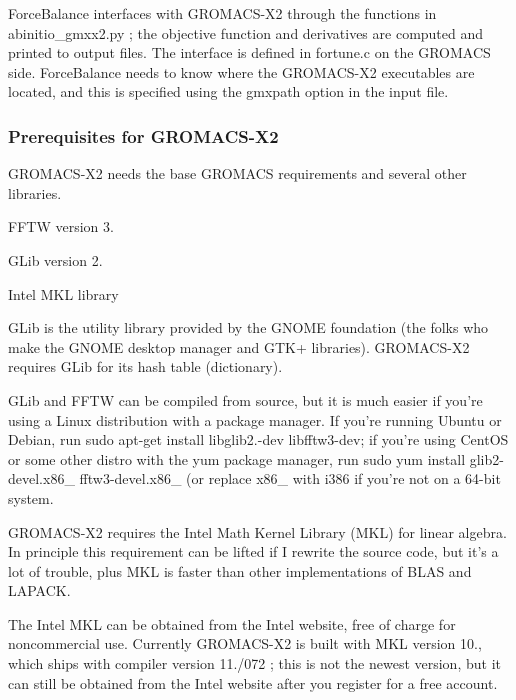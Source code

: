 Force\-Balance interfaces with G\-R\-O\-M\-A\-C\-S-\/\-X2 through the functions in {\ttfamily abinitio\-\_\-gmxx2.\-py} ; the objective function and derivatives are computed and printed to output files. The interface is defined in {\ttfamily fortune.\-c} on the G\-R\-O\-M\-A\-C\-S side. Force\-Balance needs to know where the G\-R\-O\-M\-A\-C\-S-\/\-X2 executables are located, and this is specified using the {\ttfamily gmxpath} option in the input file.\hypertarget{installation_install_gmxx2_prerequisites}{}\subsubsection{Prerequisites for G\-R\-O\-M\-A\-C\-S-\/\-X2}\label{installation_install_gmxx2_prerequisites}
G\-R\-O\-M\-A\-C\-S-\/\-X2 needs the base G\-R\-O\-M\-A\-C\-S requirements and several other libraries.

\begin{DoxyItemize}
\item F\-F\-T\-W version 3. \item G\-Lib version 2. \item Intel M\-K\-L library\end{DoxyItemize}
G\-Lib is the utility library provided by the G\-N\-O\-M\-E foundation (the folks who make the G\-N\-O\-M\-E desktop manager and G\-T\-K+ libraries). G\-R\-O\-M\-A\-C\-S-\/\-X2 requires G\-Lib for its hash table (dictionary).

G\-Lib and F\-F\-T\-W can be compiled from source, but it is much easier if you're using a Linux distribution with a package manager. If you're running Ubuntu or Debian, run {\ttfamily sudo apt-\/get install libglib2.-\/dev libfftw3-\/dev}; if you're using Cent\-O\-S or some other distro with the yum package manager, run {\ttfamily sudo yum install glib2-\/devel.\-x86\-\_ fftw3-\/devel.\-x86\-\_} (or replace {\ttfamily x86\-\_} with {\ttfamily i386} if you're not on a 64-\/bit system.

G\-R\-O\-M\-A\-C\-S-\/\-X2 requires the Intel Math Kernel Library (M\-K\-L) for linear algebra. In principle this requirement can be lifted if I rewrite the source code, but it's a lot of trouble, plus M\-K\-L is faster than other implementations of B\-L\-A\-S and L\-A\-P\-A\-C\-K.

The Intel M\-K\-L can be obtained from the Intel website, free of charge for noncommercial use. Currently G\-R\-O\-M\-A\-C\-S-\/\-X2 is built with M\-K\-L version 10., which ships with compiler version 11./072 ; this is not the newest version, but it can still be obtained from the Intel website after you register for a free account.

